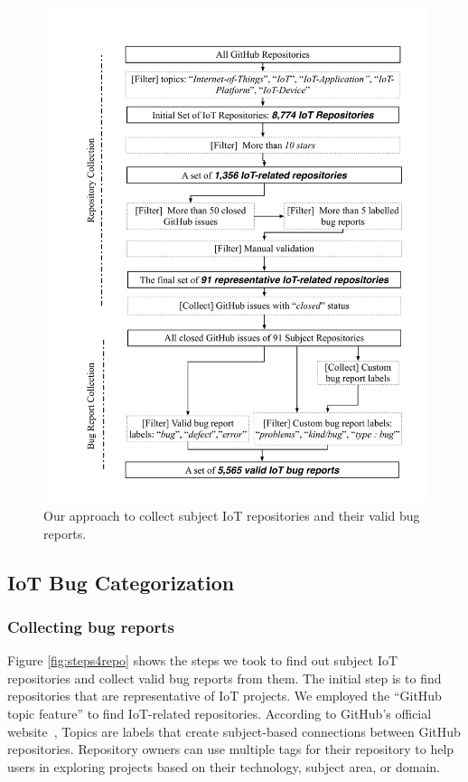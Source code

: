  \begin{figure}
  \centering
   \includegraphics[width=\linewidth]{imgs/steps4repo.pdf}
  \caption{Our approach to collect subject IoT repositories and their valid bug reports.}
  \label{fig:steps4repo}
\end{figure}

\subsection{IoT Bug Categorization}
\subsubsection{Collecting bug reports} \label{bugCollection}

Figure \autoref{fig:steps4repo} shows the steps we took to find out subject IoT repositories and collect valid bug reports from them. The initial step is to find repositories that are representative of IoT projects. We employed the ``GitHub topic feature'' to find IoT-related repositories. According to GitHub's official website~\cite{gitTopic}, Topics are labels that create subject-based connections between GitHub repositories. Repository owners can use multiple tags for their repository to help users in exploring projects based on their technology, subject area, or domain.

